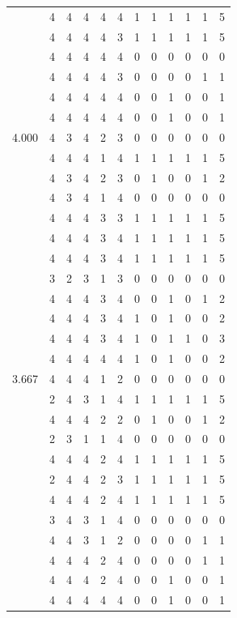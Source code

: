 \documentclass[]{msu-thesis}
\theoremstyle{definition}
\theoremstyle{definition}
\theoremstyle{definition}
\theoremstyle{remark}
\begin{document}
\begin{table}
{\begin{tabular}[t]{rrrrrrrrrrrr}
 & 4 & 4 & 4 & 4 & 4 & 1 & 1 & 1 & 1 & 1 & 5\\
 & 4 & 4 & 4 & 4 & 3 & 1 & 1 & 1 & 1 & 1 & 5\\
 & 4 & 4 & 4 & 4 & 4 & 0 & 0 & 0 & 0 & 0 & 0\\
 & 4 & 4 & 4 & 4 & 3 & 0 & 0 & 0 & 0 & 1 & 1\\
 & 4 & 4 & 4 & 4 & 4 & 0 & 0 & 1 & 0 & 0 & 1\\
 & 4 & 4 & 4 & 4 & 4 & 0 & 0 & 1 & 0 & 0 & 1\\
4.000 & 4 & 3 & 4 & 2 & 3 & 0 & 0 & 0 & 0 & 0 & 0\\
 & 4 & 4 & 4 & 1 & 4 & 1 & 1 & 1 & 1 & 1 & 5\\
 & 4 & 3 & 4 & 2 & 3 & 0 & 1 & 0 & 0 & 1 & 2\\
 & 4 & 3 & 4 & 1 & 4 & 0 & 0 & 0 & 0 & 0 & 0\\
 & 4 & 4 & 4 & 3 & 3 & 1 & 1 & 1 & 1 & 1 & 5\\
 & 4 & 4 & 4 & 3 & 4 & 1 & 1 & 1 & 1 & 1 & 5\\
 & 4 & 4 & 4 & 3 & 4 & 1 & 1 & 1 & 1 & 1 & 5\\
 & 3 & 2 & 3 & 1 & 3 & 0 & 0 & 0 & 0 & 0 & 0\\
 & 4 & 4 & 4 & 3 & 4 & 0 & 0 & 1 & 0 & 1 & 2\\
 & 4 & 4 & 4 & 3 & 4 & 1 & 0 & 1 & 0 & 0 & 2\\
 & 4 & 4 & 4 & 3 & 4 & 1 & 0 & 1 & 1 & 0 & 3\\
 & 4 & 4 & 4 & 4 & 4 & 1 & 0 & 1 & 0 & 0 & 2\\
3.667 & 4 & 4 & 4 & 1 & 2 & 0 & 0 & 0 & 0 & 0 & 0\\
 & 2 & 4 & 3 & 1 & 4 & 1 & 1 & 1 & 1 & 1 & 5\\
 & 4 & 4 & 4 & 2 & 2 & 0 & 1 & 0 & 0 & 1 & 2\\
 & 2 & 3 & 1 & 1 & 4 & 0 & 0 & 0 & 0 & 0 & 0\\
 & 4 & 4 & 4 & 2 & 4 & 1 & 1 & 1 & 1 & 1 & 5\\
 & 2 & 4 & 4 & 2 & 3 & 1 & 1 & 1 & 1 & 1 & 5\\
 & 4 & 4 & 4 & 2 & 4 & 1 & 1 & 1 & 1 & 1 & 5\\
 & 3 & 4 & 3 & 1 & 4 & 0 & 0 & 0 & 0 & 0 & 0\\
 & 4 & 4 & 3 & 1 & 2 & 0 & 0 & 0 & 0 & 1 & 1\\
 & 4 & 4 & 4 & 2 & 4 & 0 & 0 & 0 & 0 & 1 & 1\\
 & 4 & 4 & 4 & 2 & 4 & 0 & 0 & 1 & 0 & 0 & 1\\
 & 4 & 4 & 4 & 4 & 4 & 0 & 0 & 1 & 0 & 0 & 1\\

\end{tabular}}
\end{table}
\end{document}
